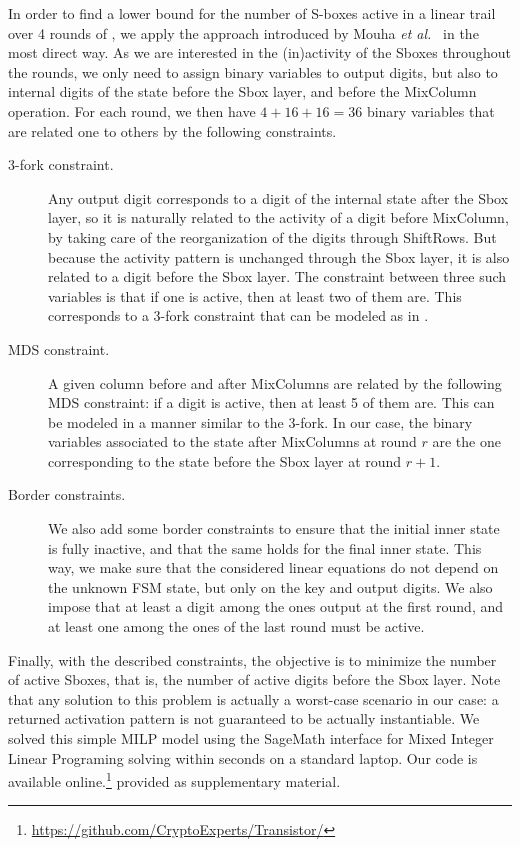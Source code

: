 In order to find a lower bound for the number of S-boxes active in a linear trail over 4 rounds of \coolName, we apply the approach introduced by Mouha \emph{et al.\@}~\cite{add:MWGP11} in the most direct way. As we are interested in the (in)activity of the Sboxes throughout the rounds, we only need to assign binary variables to output digits, but also to internal digits of the state before the Sbox layer, and before the MixColumn operation. For each round, we then have $4 + 16 + 16 = 36$ binary variables that are related one to others by the following constraints.
\begin{description}
\item[3-fork constraint.] Any output digit corresponds to a digit of the internal state after the Sbox layer, so it is naturally related to the activity of a digit before MixColumn, by taking care of the reorganization of the digits through ShiftRows. But because the activity pattern is unchanged through the Sbox layer, it is also related to a digit before the Sbox layer. The constraint between three such variables is that if one is active, then at least two of them are. This corresponds to a 3-fork constraint that can be modeled as in \cite[Sec~ 2.2]{add:MWGP11}.
\item[MDS constraint.] A given column before and after MixColumns are related by the following MDS constraint: if a digit is active, then at least 5 of them are. This can be modeled in a manner similar to the 3-fork. In our case, the binary variables associated to the state after MixColumns at round $r$ are the one corresponding to the state before the Sbox layer at round $r+1$.
\item[Border constraints.] We also add some border constraints to ensure that the initial inner state is fully inactive, and that the same holds for the final inner state. This way, we make sure that the considered linear equations do not depend on the unknown FSM state, but only on the key and output digits. We also impose that at least a digit among the ones output at the first round, and at least one among the ones of the last round must be active.
\end{description}
Finally, with the described constraints, the objective is to minimize the number of active Sboxes, that is, the number of active digits before the Sbox layer. Note that any solution to this problem is actually a worst-case scenario in our case: a returned activation pattern is not guaranteed to be actually instantiable. We solved this simple MILP model using the SageMath interface for Mixed Integer Linear Programing solving within seconds on a standard laptop. Our code is 
\ifeprint
  available online.\footnote{\url{https://github.com/CryptoExperts/Transistor/}}
\else
  provided as supplementary material.
\fi

